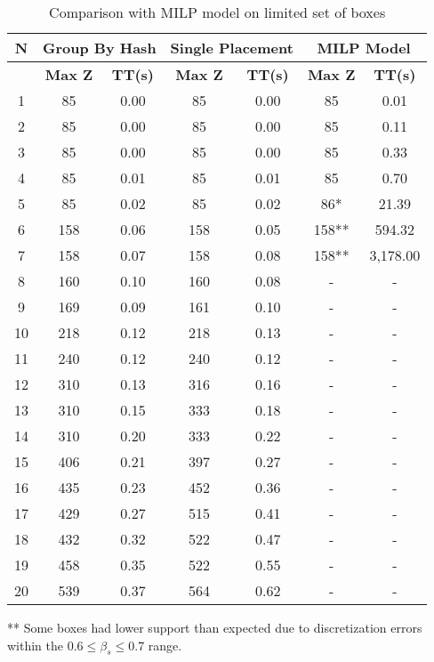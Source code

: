 \begin{table}[htbp]
    \centering
    \caption{Comparison with MILP model on limited set of boxes}
    \begin{tabular}{|c|c|c|c|c|c|c|}
    \hline
    \textbf{N} & \multicolumn{ 2}{c|}{\textbf{Group By Hash}} & \multicolumn{ 2}{c|}{\textbf{Single Placement}} & \multicolumn{ 2}{c|}{\textbf{MILP Model}} \\ \hline
    \multicolumn{1}{|l|}{} & \textbf{Max Z} & \textbf{TT(s)} & \textbf{Max Z} & \textbf{TT(s)} & \textbf{Max Z} & \textbf{TT(s)} \\ \hline
    1 & 85 & 0.00 & 85 & 0.00 & 85 & 0.01 \\ 
    2 & 85 & 0.00 & 85 & 0.00 & 85 & 0.11 \\ 
    3 & 85 & 0.00 & 85 & 0.00 & 85 & 0.33 \\ 
    4 & 85 & 0.01 & 85 & 0.01 & 85 & 0.70 \\ 
    5 & 85 & 0.02 & 85 & 0.02 & 86* & 21.39 \\ 
    6 & 158 & 0.06 & 158 & 0.05 & 158** & 594.32 \\ 
    7 & 158 & 0.07 & 158 & 0.08 & 158** & 3,178.00 \\ \hline
    8 & 160 & 0.10 & 160 & 0.08 & - & - \\ 
    9 & 169 & 0.09 & 161 & 0.10 & - & - \\ 
    10 & 218 & 0.12 & 218 & 0.13 & - & - \\ 
    11 & 240 & 0.12 & 240 & 0.12 & - & - \\ 
    12 & 310 & 0.13 & 316 & 0.16 & - & - \\ 
    13 & 310 & 0.15 & 333 & 0.18 & - & - \\ 
    14 & 310 & 0.20 & 333 & 0.22 & - & - \\ 
    15 & 406 & 0.21 & 397 & 0.27 & - & - \\ 
    16 & 435 & 0.23 & 452 & 0.36 & - & - \\ 
    17 & 429 & 0.27 & 515 & 0.41 & - & - \\ 
    18 & 432 & 0.32 & 522 & 0.47 & - & - \\ 
    19 & 458 & 0.35 & 522 & 0.55 & - & - \\ 
    20 & 539 & 0.37 & 564 & 0.62 & - & - \\ \hline
    \end{tabular}
    \label{exp:model}
    \end{table}
** Some boxes had lower support than expected due to discretization errors within the $ 0.6 \le \beta_s \le 0.7$ range.